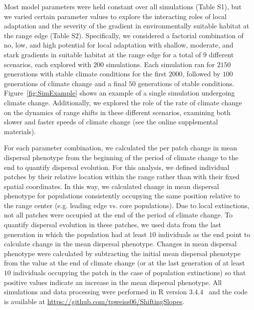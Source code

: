 \documentclass[12pt, oneside]{article}
\begin{document}
Most model parameters were held constant over all simulations (Table S1), but we varied certain parameter values to explore the interacting roles of local adaptation and the severity of the gradient in environmentally suitable habitat at the range edge (Table S2). Specifically, we considered a factorial combination of no, low, and high potential for local adaptation with shallow, moderate, and stark gradients in suitable habitat at the range edge for a total of $9$ different scenarios, each explored with $200$ simulations. Each simulation ran for $2150$ generations with stable climate conditions for the first $2000$, followed by $100$ generations of climate change and a final $50$ generations of stable conditions. Figure~\ref{fig:SimExample} shows an example of a single simulation undergoing climate change. Additionally, we explored the role of the rate of climate change on the dynamics of range shifts in these different scenarios, examining both slower and faster speeds of climate change (see the online supplemental materials). 

For each parameter combination, we calculated the per patch change in mean dispersal phenotype from the beginning of the period of climate change to the end to quantify dispersal evolution. For this analysis, we defined individual patches by their relative location within the range rather than with their fixed spatial coordinates. In this way, we calculated change in mean dispersal phenotype for populations consistently occupying the same position relative to the range center (e.g. leading edge vs. core populations). Due to local extinctions, not all patches were occupied at the end of the period of climate change. To quantify dispersal evolution in these patches, we used data from the last generation in which the population had at least $10$ individuals as the end point to calculate change in the mean dispersal phenotype. Changes in mean dispersal phenotype were calculated by subtracting the initial mean dispersal phenotype from the value at the end of climate change (or at the last generation of at least $10$ individuals occupying the patch in the case of population extinctions) so that positive values indicate an increase in the mean dispersal phenotype. All simulations and data processing were performed in R version $3.4.4$~\citep{team2000r} and the code is available at \url{https://github.com/tpweiss06/ShiftingSlopes}.
\end{document}
